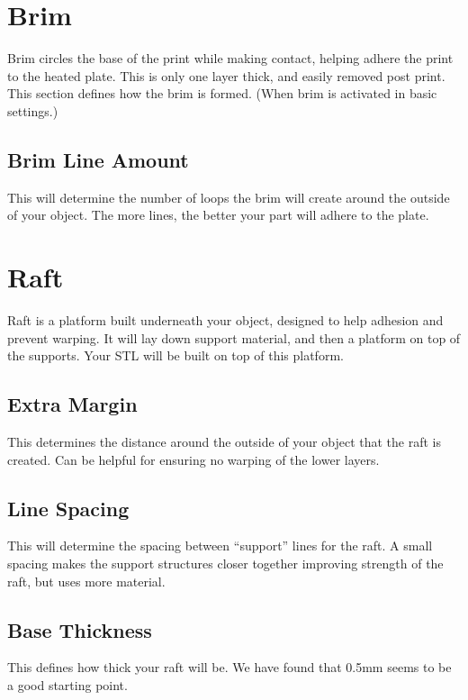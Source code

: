 \section{Brim}

Brim circles the base of the print while making contact, helping adhere the print to the heated plate. This is only one layer thick, and easily removed post print. This section defines how the brim is formed. (When brim is activated in basic settings.)

\subsection{Brim Line Amount}
This will determine the number of loops the brim will create around the outside of your object. The more lines, the better your part will adhere to the plate. 

\section{Raft}

Raft is a platform built underneath your object, designed to help adhesion and prevent warping. It will lay down support material, and then a platform on top of the supports. Your STL will be built on top of this platform. 

\subsection{Extra Margin}

This determines the distance around the outside of your object that the raft is created. Can be helpful for ensuring no warping of the lower layers.

\subsection{Line Spacing}

This will determine the spacing between “support” lines for the raft. A small spacing makes the support structures closer together improving strength of the raft, but uses more material.

\subsection{Base Thickness}

This defines how thick your raft will be. We have found that 0.5mm seems to be a good starting point.

